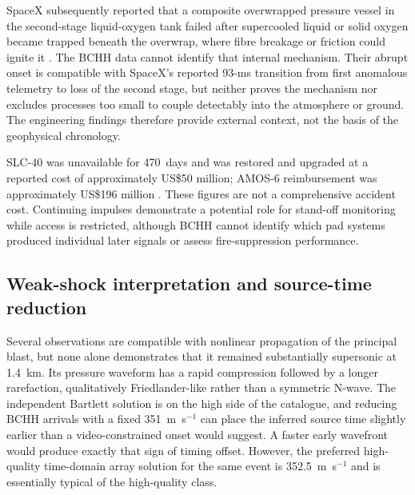\documentclass[]{seismica}
\begin{document}
SpaceX subsequently reported that a composite overwrapped pressure vessel in
the second-stage liquid-oxygen tank failed after supercooled liquid or solid
oxygen became trapped beneath the overwrap, where fibre breakage or friction
could ignite it \citep{spacex_anomaly_2017,nasa_sma_falcon9}. The BCHH data
cannot identify that internal mechanism. Their abrupt onset is compatible with
SpaceX's reported 93-ms transition from first anomalous telemetry to loss of
the second stage, but neither proves the mechanism nor excludes processes too
small to couple detectably into the atmosphere or ground. The engineering
findings therefore provide external context, not the basis of the geophysical
chronology.

SLC-40 was unavailable for 470~days and was restored and upgraded at a reported
cost of approximately US\$50 million; AMOS-6 reimbursement was approximately
US\$196 million \citep{clark_slc40_2017,magan_amos6_2016,
spacex_crs13_2017}. These figures are not a comprehensive accident cost.
Continuing impulses demonstrate a potential role for stand-off monitoring
while access is restricted, although BCHH cannot identify which pad systems
produced individual later signals or assess fire-suppression performance.

\subsection{Weak-shock interpretation and source-time reduction}

Several observations are compatible with nonlinear propagation of the
principal blast, but none alone demonstrates that it remained substantially
supersonic at 1.4~km. Its pressure waveform has a rapid compression followed by
a longer rarefaction, qualitatively Friedlander-like rather than a symmetric
N-wave. The independent Bartlett solution is on the high side of the catalogue,
and reducing BCHH arrivals with a fixed 351~m~s$^{-1}$ can place the inferred
source time slightly earlier than a video-constrained onset would suggest. A
faster early wavefront would produce exactly that sign of timing offset.
However, the preferred high-quality time-domain array solution for the same
event is 352.5~m~s$^{-1}$ and is essentially typical of the high-quality class.
\end{document}
